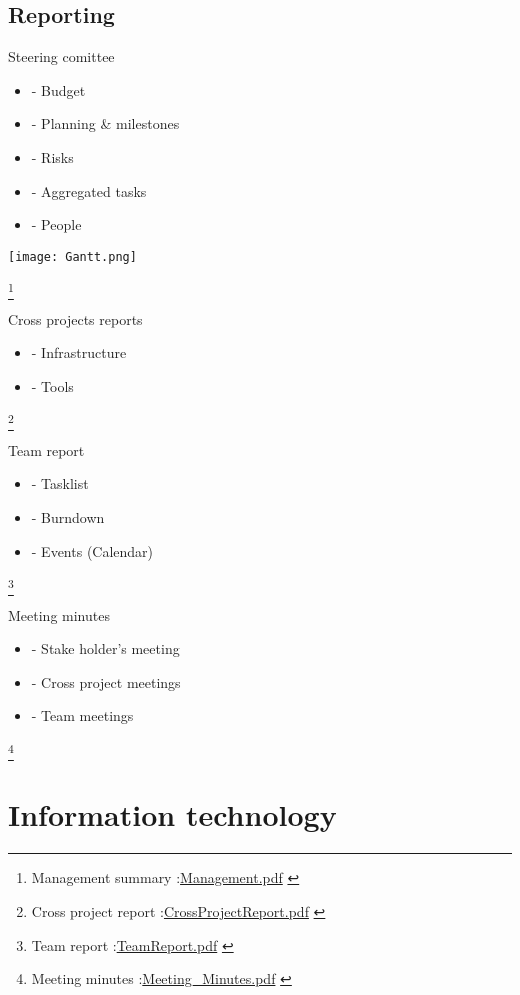 \documentclass[8pt]{beamer}
\begin{document}
\subsection{Reporting}

\begin{frame}{Steering comittee}
\begin{multicols}{2}
[
]
\begin{itemize}
  \item
- Budget
  \item
- Planning \& milestones
  \item
- Risks
  \item
- Aggregated tasks
  \item
- People 
\end{itemize}
\texttt{[image: Gantt.png]}
%
\end{multicols}
\footnote{
\tiny{Management summary :\url{Management.pdf} }
}
\end{frame}

\begin{frame}{Cross projects reports}
  \begin{itemize}
  \item
- Infrastructure
  \item
- Tools
  \end{itemize}
\footnote{
\tiny{Cross project report :\url{CrossProjectReport.pdf} }
}
\end{frame}

\begin{frame}{Team report}
  \begin{itemize}
  \item
- Tasklist
  \item
- Burndown
  \item
- Events (Calendar)
  \end{itemize}
\footnote{
\tiny{Team report :\url{TeamReport.pdf} }
}
\end{frame}

\begin{frame}{Meeting minutes}
  \begin{itemize}
  \item
- Stake holder's meeting
  \item
- Cross project meetings
  \item
- Team meetings
  \end{itemize}
\footnote{
\tiny{Meeting minutes :\url{Meeting\_Minutes.pdf} }
}
\end{frame}

\section{Information technology}
\end{document}
